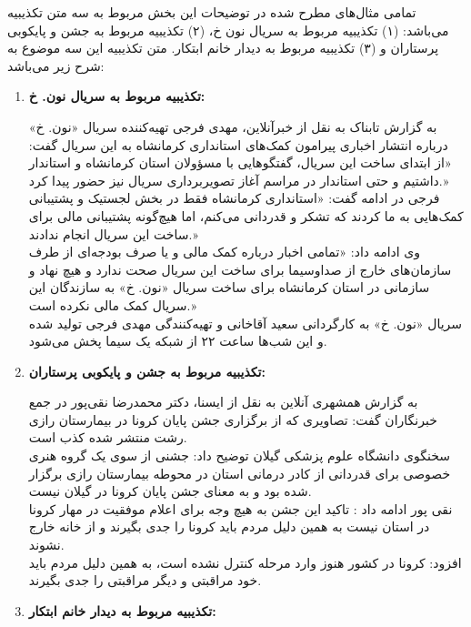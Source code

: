 تمامی مثال‌های مطرح شده در توضیحات این بخش مربوط به سه متن تکذیبیه می‌باشد: (۱) تکذیبیه مربوط به سریال نون خ، (۲) تکذیبیه مربوط به جشن و پایکوبی پرستاران و (۳) تکذیبیه مربوط به دیدار خانم ابتکار. متن تکذیبیه این سه موضوع به شرح زیر می‌باشد:

\begin{enumerate}
\item \textbf{تکذیبیه مربوط به سریال نون. خ:}

به گزارش تابناک به نقل از خبرآنلاین، مهدی فرجی تهیه‌کننده سریال «نون. خ» درباره انتشار اخباری پیرامون کمک‌های استانداری کرمانشاه به این سریال گفت: «از ابتدای ساخت این سریال، گفتگو‌هایی با مسؤولان استان کرمانشاه و استاندار داشتیم و حتی استاندار در مراسم آغاز تصویربرداری سریال نیز حضور پیدا کرد.»\\
فرجی در ادامه گفت: «استانداری کرمانشاه فقط در بخش لجستیک و پشتیبانی کمک‌هایی به ما کردند که تشکر و قدردانی می‌کنم، اما هیچ‌گونه پشتیبانی مالی برای ساخت این سریال انجام ندادند.»\\
وی ادامه داد: «تمامی اخبار درباره کمک مالی و یا صرف بودجه‌ای از طرف سازمان‌های خارج از صداوسیما برای ساخت این سریال صحت ندارد و هیچ نهاد و سازمانی در استان کرمانشاه برای ساخت سریال «نون. خ» به سازندگان این سریال کمک مالی نکرده است.»
\\
سریال «نون. خ» به کارگردانی سعید آقاخانی و تهیه‌کنندگی مهدی فرجی تولید شده و این شب‌ها ساعت ۲۲ از شبکه یک سیما پخش می‌شود.

\vspace{3mm}
\item \textbf{تکذیبیه مربوط به جشن و پایکوبی پرستاران:}

به گزارش همشهری آنلاین به نقل از ایسنا، دکتر محمدرضا نقی‌پور در جمع خبرنگاران گفت: تصاویری که از برگزاری جشن پایان کرونا در بیمارستان رازی رشت منتشر شده کذب است.
\\
سخنگوی دانشگاه علوم پزشکی گیلان توضیح داد: جشنی از سوی یک گروه هنری خصوصی برای قدردانی از کادر درمانی استان در محوطه بیمارستان رازی برگزار شده بود و به معنای جشن پایان کرونا در گیلان نیست.
\\
نقی پور ادامه داد : تاکید این جشن به هیچ وجه برای اعلام موفقیت در مهار کرونا در استان نیست به همین دلیل مردم باید کرونا را جدی بگیرند و از خانه‌ خارج نشوند.
\\
افزود: کرونا در کشور هنوز وارد مرحله کنترل نشده است، به همین دلیل مردم باید خود مراقبتی و دیگر مراقبتی را جدی بگیرند.

\vspace{3mm}
\item \textbf{تکذیبیه مربوط به دیدار خانم ابتکار:}


\end{enumerate}
